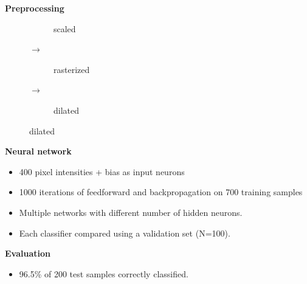 \documentclass[landscape,paper=160mm:90mm,fontsize=10pt,DIV=16]{scrartcl}
\newenvironment{slide}[1]{\clearpage
    {\LARGE\bfseries#1\par}
}{}
\begin{document}
\begin{slide}{Preprocessing}
    \vspace{1cm}
    \begin{figure}[h]
        \centering
        \begin{subfigure}[c]{0.3\textwidth}
            \centering
            \vspace*{-3.5mm}
            \resizebox{\textwidth}{!}{}
            \vspace*{-9mm}
            \caption{scaled}
        \end{subfigure}%
        {\large $\rightarrow$}
        \begin{subfigure}[c]{0.3\textwidth}
            \hspace*{4mm}
            \vfill
            \caption{rasterized}
        \end{subfigure}%
        {\large $\rightarrow$}
        \begin{subfigure}[c]{0.3\textwidth}
            \centering
            \hspace*{1mm}
            \vfill
            \caption{dilated}
        \end{subfigure}
    \end{figure}
\end{slide}

\begin{slide}{Neural network}
    \begin{minipage}{0.3\textwidth}
        \begin{itemize}
            \item 400 pixel intensities + bias as input neurons
            \item 1000 iterations of feedforward and backpropagation on 700
                training samples
            \item Multiple networks with different number of hidden neurons.
            \item Each classifier compared using a validation set (N=100).
        \end{itemize}
    \end{minipage}
    \begin{minipage}{0.7\textwidth}
        \vspace*{-5mm}
        \centering
        \resizebox*{\textwidth}{!}{}
    \end{minipage}
\end{slide}

\begin{slide}{Evaluation}
    \centering
    \begin{itemize}
        \item 96.5\% of 200 test samples correctly classified.
    \end{itemize}
    \centering
    \resizebox*{0.9\textwidth}{!}{}
\end{slide}
\end{document}
